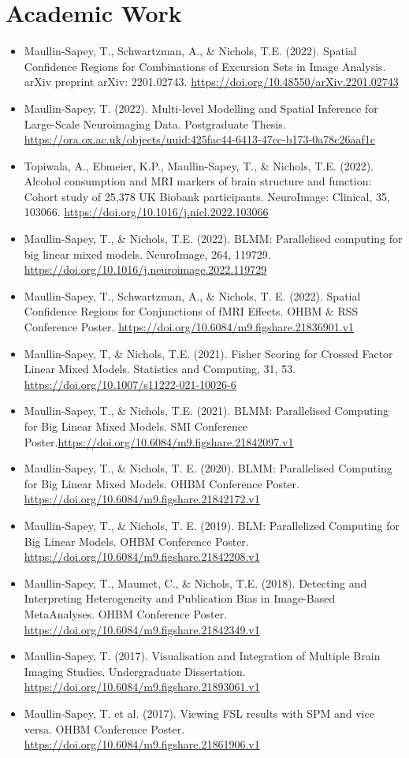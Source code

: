 \documentclass{friggeri-cv}
\begin{document}
\section{Academic Work}
\footnotesize{
\begin{itemize}
    \item Maullin-Sapey, T., Schwartzman, A., \& Nichols, T.E. (2022). Spatial Confidence Regions for Combinations of Excursion Sets in Image Analysis. arXiv preprint arXiv: 2201.02743. \url{https://doi.org/10.48550/arXiv.2201.02743}
    \item Maullin-Sapey, T. (2022). Multi-level Modelling and Spatial Inference for Large-Scale Neuroimaging Data. Postgraduate Thesis. \url{https://ora.ox.ac.uk/objects/uuid:425fac44-6413-47cc-b173-0a78c26aaf1c}
    \item Topiwala, A., Ebmeier, K.P., Maullin-Sapey, T., \& Nichols, T.E. (2022). Alcohol consumption and MRI markers of brain structure and function: Cohort study of 25,378 UK Biobank participants. NeuroImage: Clinical, 35, 103066. \url{https://doi.org/10.1016/j.nicl.2022.103066}
    \item Maullin-Sapey, T., \& Nichols, T.E. (2022). BLMM: Parallelised computing for big linear mixed models. NeuroImage, 264, 119729. \url{https://doi.org/10.1016/j.neuroimage.2022.119729}
    \item Maullin-Sapey, T., Schwartzman, A., \& Nichols, T. E. (2022). Spatial Confidence Regions for Conjunctions of fMRI Effects. OHBM \& RSS Conference Poster. \url{https://doi.org/10.6084/m9.figshare.21836901.v1}
    \item Maullin-Sapey, T, \& Nichols, T.E. (2021). Fisher Scoring for Crossed Factor Linear Mixed Models. Statistics and Computing, 31, 53. \url{https://doi.org/10.1007/s11222-021-10026-6}
    \item Maullin-Sapey, T., \& Nichols, T.E. (2021). BLMM: Parallelised Computing for Big Linear Mixed Models. SMI Conference Poster.\url{https://doi.org/10.6084/m9.figshare.21842097.v1}
    \item Maullin-Sapey, T., \& Nichols, T. E. (2020). BLMM: Parallelised Computing for Big Linear Mixed Models. OHBM Conference Poster. \url{https://doi.org/10.6084/m9.figshare.21842172.v1}
    \item Maullin-Sapey, T., \& Nichols, T. E. (2019). BLM: Parallelized Computing for Big Linear Models. OHBM Conference Poster. \url{https://doi.org/10.6084/m9.figshare.21842208.v1}
    \item Maullin-Sapey, T., Maumet, C., \& Nichols, T.E. (2018). Detecting and Interpreting Heterogeneity and Publication Bias in Image-Based MetaAnalyses. OHBM Conference Poster. \url{https://doi.org/10.6084/m9.figshare.21842349.v1}
    \item Maullin-Sapey, T. (2017). Visualisation and Integration of Multiple Brain Imaging Studies. Undergraduate Dissertation. \url{https://doi.org/10.6084/m9.figshare.21893061.v1}
    \item Maullin-Sapey, T. et al. (2017). Viewing FSL results with SPM and vice versa. OHBM Conference Poster. \url{https://doi.org/10.6084/m9.figshare.21861906.v1}
\end{itemize}
}
\normalsize
\end{document}
